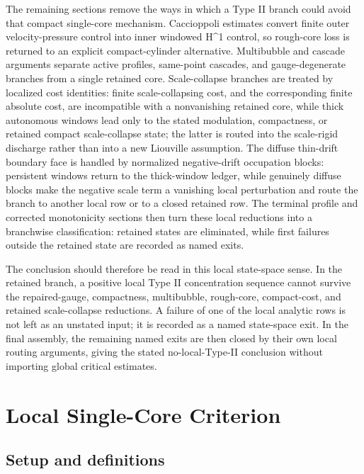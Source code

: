 \documentclass[11pt]{amsart}
\def\({}%
\def\){}%
\theoremstyle{plain}
\theoremstyle{definition}
\theoremstyle{remark}
\begin{document}
The remaining sections remove the ways in which a Type II branch could avoid
that compact single-core mechanism.  Caccioppoli estimates convert finite outer
velocity-pressure control into inner windowed \(H^1\) control, so rough-core
loss is returned to an explicit compact-cylinder alternative.  Multibubble and
cascade arguments separate active profiles, same-point cascades, and
gauge-degenerate branches from a single retained core.  Scale-collapse branches
are treated by localized cost identities: finite scale-collapsing cost, and the
corresponding finite absolute cost, are incompatible with a nonvanishing
retained core, while thick autonomous windows lead only to the stated
modulation, compactness, or retained compact scale-collapse state; the latter
is routed into the scale-rigid discharge rather than into a new Liouville
assumption.  The diffuse thin-drift boundary face is handled by normalized
negative-drift occupation blocks: persistent windows return to the thick-window
ledger, while genuinely diffuse blocks make the negative scale term a
vanishing local perturbation and route the branch to another local row or to a
closed retained row.  The terminal profile and corrected monotonicity sections
then turn these local reductions into a branchwise classification: retained states are
eliminated, while first failures outside the retained state are recorded as
named exits.

The conclusion should therefore be read in this local state-space sense.  In the
retained branch, a positive local Type II concentration sequence cannot survive
the repaired-gauge, compactness, multibubble, rough-core, compact-cost, and
retained scale-collapse reductions.  A failure of one of the local analytic rows
is not left as an unstated input; it is recorded as a named state-space
exit.  In the final assembly, the remaining named exits are then closed by
their own local routing arguments, giving the stated no-local-Type-II
conclusion without importing global critical estimates.

\clearpage

\section{Local Single-Core Criterion}\label{sec:single-core-criterion}

\subsection{Setup and definitions}
\end{document}
